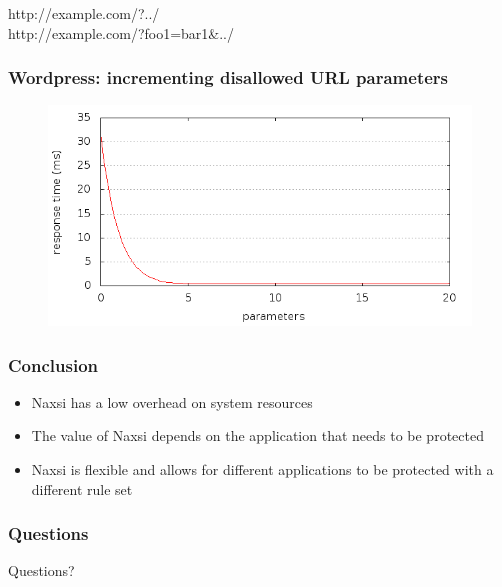 \begin{frame}[noframenumbering]
  \mbox{http://example.com/?../}\\
  \mbox{http://example.com/?foo1=bar1\&../}
  
  \frametitle{Wordpress: incrementing disallowed URL parameters}
  \begin{figure}[H]
  \centering
  \includegraphics[scale=0.5] {../paper/images/results/wp_with_naxsi_incremented_disallowed_parameters/output.png}
  \end{figure}
\end{frame}   
  
\begin{frame}[noframenumbering]
  \frametitle{Conclusion}
  \begin{itemize}
    \item Naxsi has a low overhead on system resources
    \item The value of Naxsi depends on the application that needs to be protected
    \item Naxsi is flexible and allows for different applications to be protected with a different rule set
  \end{itemize}
\end{frame}

\begin{frame}[noframenumbering]
  \frametitle{Questions}
  \begin{center}
  Questions?
  \end{center}
\end{frame}